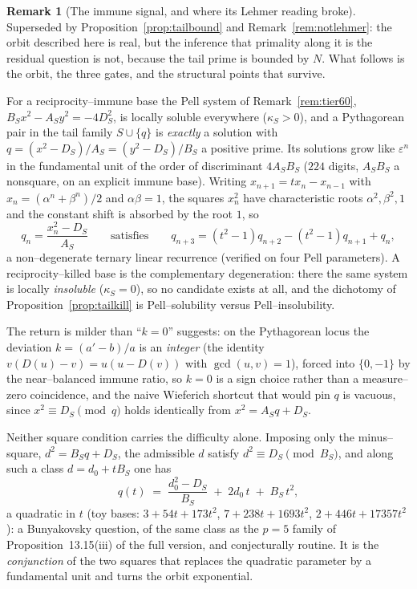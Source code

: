 \documentclass[11pt]{article}
\theoremstyle{definition}
\newtheorem{remark}[theorem]{Remark}
\begin{document}
\begin{remark}[The immune signal, and where its Lehmer reading broke]\label{rem:lehmer}
Superseded by Proposition~\ref{prop:tailbound} and Remark~\ref{rem:notlehmer}: the orbit described
here is real, but the inference that primality along it is the residual question is not, because the
tail prime is bounded by $N$. What follows is the orbit, the three gates, and the structural points
that survive.

For a reciprocity--immune base the Pell system of Remark~\ref{rem:tier60},
$B_Sx^2-A_Sy^2=-4D_S^2$, is locally soluble everywhere ($\kappa_S>0$), and a Pythagorean pair in the
tail family $S\cup\{q\}$ is \emph{exactly} a solution with $q=(x^2-D_S)/A_S=(y^2-D_S)/B_S$ a
positive prime. Its solutions grow like $\varepsilon^n$ in the fundamental unit of the order of
discriminant $4A_SB_S$ ($224$ digits, $A_SB_S$ a nonsquare, on an explicit immune base). Writing
$x_{n+1}=tx_n-x_{n-1}$ with $x_n=(\alpha^n+\beta^n)/2$ and $\alpha\beta=1$, the squares $x_n^2$ have
characteristic roots $\alpha^2,\beta^2,1$ and the constant shift is absorbed by the root $1$, so
\[ q_n=\frac{x_n^2-D_S}{A_S}\qquad\text{satisfies}\qquad q_{n+3}=(t^2-1)q_{n+2}-(t^2-1)q_{n+1}+q_n, \]
a non--degenerate ternary linear recurrence (verified on four Pell parameters). A
reciprocity--killed base is the complementary degeneration: there the same system is locally
\emph{insoluble} ($\kappa_S=0$), so no candidate exists at all, and the dichotomy of
Proposition~\ref{prop:tailkill} is Pell--solubility versus Pell--insolubility.

The return is milder than ``$k=0$'' suggests: on the Pythagorean locus the deviation $k=(a'-b)/a$ is
an \emph{integer} (the identity $v(D(u)-v)=u(u-D(v))$ with $\gcd(u,v)=1$), forced into $\{0,-1\}$ by
the near--balanced immune ratio, so $k=0$ is a sign choice rather than a measure--zero coincidence,
and the naive Wieferich shortcut that would pin $q$ is vacuous, since $x^2\equiv D_S\pmod q$ holds
identically from $x^2=A_Sq+D_S$.

Neither square condition carries the difficulty alone. Imposing only the minus--square,
$d^2=B_Sq+D_S$, the admissible $d$ satisfy $d^2\equiv D_S\pmod{B_S}$, and along such a class
$d=d_0+tB_S$ one has
\[ q(t)\;=\;\frac{d_0^2-D_S}{B_S}\;+\;2d_0\,t\;+\;B_S\,t^2, \]
a quadratic in $t$ (toy bases: $3+54t+173t^2$, $7+238t+1693t^2$, $2+446t+17357t^2$): a Bunyakovsky
question, of the same class as the $p=5$ family of Proposition~13.15\textup{(iii)} of the full version, and
conjecturally routine. It is the \emph{conjunction} of the two squares that replaces the quadratic
parameter by a fundamental unit and turns the orbit exponential.


\end{remark}
\end{document}
